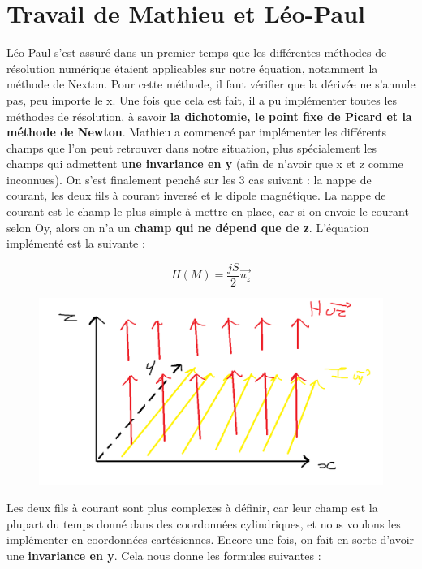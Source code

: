 \documentclass{article}
\begin{document}
\section{Travail de Mathieu et Léo-Paul}
Léo-Paul s'est assuré dans un premier temps que les différentes méthodes de résolution numérique étaient applicables sur notre équation, notamment la méthode de Nexton. Pour cette méthode, il faut vérifier que la dérivée ne s'annule pas, peu importe le x. Une fois que cela est fait, il a pu implémenter toutes les méthodes de résolution, à savoir \textbf{la dichotomie, le point fixe de Picard et la méthode de Newton}.
\newline
Mathieu a commencé par implémenter les différents champs que l'on peut retrouver dans notre situation, plus spécialement les champs qui admettent \textbf{une invariance en y} (afin de n'avoir que x et z comme inconnues). On s'est finalement penché sur les 3 cas suivant : la nappe de courant, les deux fils à courant inversé et le dipole magnétique.
\newline
La nappe de courant est le champ le plus simple à mettre en place, car si on envoie le courant selon Oy, alors on n'a un \textbf{champ qui ne dépend que de z}. L'équation implémenté est la suivante : 

\begin{equation}
H(M) = \frac{jS}{2}\vec{u_{z}}
\label{eq08}
\end{equation}
\begin{figure}[h]
	\centering
    \includegraphics[width=.5\linewidth]{Nappe.png}
    
\end{figure}
\newpage

Les deux fils à courant sont plus complexes à définir, car leur champ est la plupart du temps donné dans des coordonnées cylindriques, et nous voulons les implémenter en coordonnées cartésiennes. Encore une fois, on fait en sorte d'avoir une \textbf{invariance en y}. Cela nous donne les formules suivantes :
\end{document}
